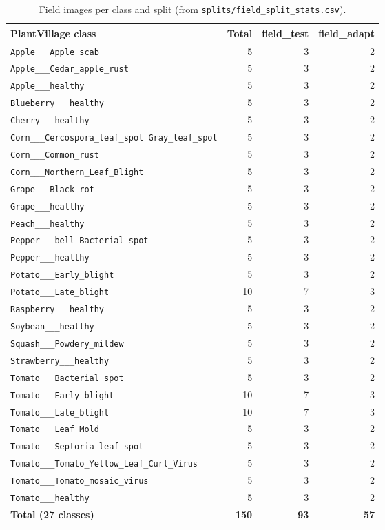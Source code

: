 \begin{table}[htbp]
\centering
\small
\caption{Field images per class and split (from \texttt{splits/field\_split\_stats.csv}).}
\label{tab:field_counts}
\begin{tabular}{lrrr}
\toprule
\textbf{PlantVillage class} & \textbf{Total} & \textbf{field\_test} & \textbf{field\_adapt} \\
\midrule
\texttt{Apple\_\_\_Apple\_scab} & 5 & 3 & 2 \\
\texttt{Apple\_\_\_Cedar\_apple\_rust} & 5 & 3 & 2 \\
\texttt{Apple\_\_\_healthy} & 5 & 3 & 2 \\
\texttt{Blueberry\_\_\_healthy} & 5 & 3 & 2 \\
\texttt{Cherry\_\_\_healthy} & 5 & 3 & 2 \\
\texttt{Corn\_\_\_Cercospora\_leaf\_spot Gray\_leaf\_spot} & 5 & 3 & 2 \\
\texttt{Corn\_\_\_Common\_rust} & 5 & 3 & 2 \\
\texttt{Corn\_\_\_Northern\_Leaf\_Blight} & 5 & 3 & 2 \\
\texttt{Grape\_\_\_Black\_rot} & 5 & 3 & 2 \\
\texttt{Grape\_\_\_healthy} & 5 & 3 & 2 \\
\texttt{Peach\_\_\_healthy} & 5 & 3 & 2 \\
\texttt{Pepper\_\_\_bell\_Bacterial\_spot} & 5 & 3 & 2 \\
\texttt{Pepper\_\_\_healthy} & 5 & 3 & 2 \\
\texttt{Potato\_\_\_Early\_blight} & 5 & 3 & 2 \\
\texttt{Potato\_\_\_Late\_blight} & 10 & 7 & 3 \\
\texttt{Raspberry\_\_\_healthy} & 5 & 3 & 2 \\
\texttt{Soybean\_\_\_healthy} & 5 & 3 & 2 \\
\texttt{Squash\_\_\_Powdery\_mildew} & 5 & 3 & 2 \\
\texttt{Strawberry\_\_\_healthy} & 5 & 3 & 2 \\
\texttt{Tomato\_\_\_Bacterial\_spot} & 5 & 3 & 2 \\
\texttt{Tomato\_\_\_Early\_blight} & 10 & 7 & 3 \\
\texttt{Tomato\_\_\_Late\_blight} & 10 & 7 & 3 \\
\texttt{Tomato\_\_\_Leaf\_Mold} & 5 & 3 & 2 \\
\texttt{Tomato\_\_\_Septoria\_leaf\_spot} & 5 & 3 & 2 \\
\texttt{Tomato\_\_\_Tomato\_Yellow\_Leaf\_Curl\_Virus} & 5 & 3 & 2 \\
\texttt{Tomato\_\_\_Tomato\_mosaic\_virus} & 5 & 3 & 2 \\
\texttt{Tomato\_\_\_healthy} & 5 & 3 & 2 \\
\midrule
\textbf{Total (27 classes)} & \textbf{150} & \textbf{93} & \textbf{57} \\
\bottomrule
\end{tabular}
\end{table}

